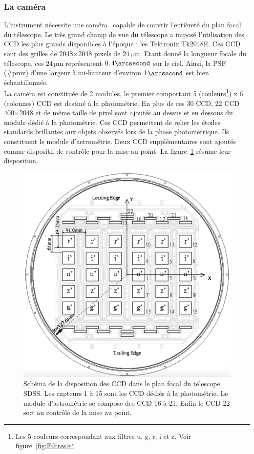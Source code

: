 \documentclass[11pt, twoside, a4paper, openright]{report}
\begin{document}
\subsubsection{La caméra}
L'instrument nécessite une caméra~\cite{Gunn1998} capable de couvrir l'entièreté du plan focal du télescope. Le très grand champ de vue du télescope a imposé l'utilisation des CCD les plus grands disponibles à l'époque : les Tektronix Tk2048E. Ces CCD sont des grilles de \num{2048}$\times$\num{2048} pixels de $24\,\mathrm{\mu m}$. Etant donné la longueur focale du télescope, ces $24\,\mathrm{\mu m}$ représentent $0,4\arcsecond$ sur le ciel. Ainsi, la PSF (\#prov) d'une largeur à mi-hauteur d'environ 1$\arcsecond$ est bien échantillonnée. \\
La caméra est constituée de 2 modules, le premier comportant 5 (couleurs\footnote{Les 5 couleurs correspondant aux filtres u, g, r, i et z. Voir figure~\ref{fig:Filtres}}) x 6 (colonnes) CCD est destiné à la photométrie. En plus de ces 30 CCD, 22 CCD \num{400}$\times$\num{2048} et de même taille de pixel sont ajoutés au dessus et en dessous du module dédié à la photométrie. Ces CCD permettent de relier les étoiles standards brillantes aux objets observés lors de la phase photométrique. Ils constituent le module d'astrométrie. Deux CCD supplémentaires sont ajoutés comme dispositif de contrôle pour la mise au point. La figure~\ref{fig:CcdSchema} résume leur disposition.
\begin{figure}
  \centering
  \includegraphics[scale=0.3]{../img/eBOSS/CcdSchema}
  \caption{Schéma de la disposition des CCD dans le plan focal du télescope SDSS. Les capteurs 1 à 15 sont les CCD dédiés à la photométrie. Le module d'astrométrie se compose des CCD 16 à 21. Enfin le CCD 22 sert au contrôle de la mise au point.}
  \label{fig:CcdSchema}
\end{figure}
\end{document}
